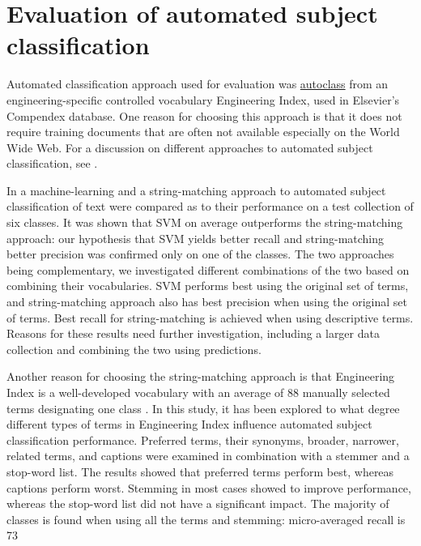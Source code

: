 \section{Evaluation of automated subject classification}
\label{autoclasseval}

Automated classification approach used for evaluation was \hyperref{string-matching of terms}{string-matching of terms (section }{)}{autoclass} from an engineering-specific controlled vocabulary Engineering Index, used in Elsevier's Compendex database. One reason for choosing this approach is that it does not require training documents that are often not available especially on the World Wide Web. For a discussion on different approaches to automated subject classification, see \cite{Golub_Review}. 

In \cite{ardo06:_ECDL} a machine-learning and a string-matching approach to automated subject classification of text were compared as to their performance on a test collection of six classes. It was shown that SVM on average outperforms the string-matching approach: our hypothesis that SVM yields better recall and string-matching better precision was confirmed only on one of the classes. The two approaches being complementary, we investigated different combinations of the two based on combining their vocabularies. SVM performs best using the original set of terms, and string-matching approach also has best precision when using the original set of terms. Best recall for string-matching is achieved when using descriptive terms. Reasons for these results need further investigation, including a larger data collection and combining the two using predictions. 

Another reason for choosing the string-matching approach is that Engineering Index is a well-developed vocabulary with an average of 88 manually selected terms designating one class \cite{GolubRole}. In this study, it has been explored to what degree different types of terms in Engineering Index influence automated subject classification performance. Preferred terms, their synonyms, broader, narrower, related terms, and captions were examined in combination with a stemmer and a stop-word list. The results showed that preferred terms perform best, whereas captions perform worst. Stemming in most cases showed to improve performance, whereas the stop-word list did not have a significant impact. The majority of classes is found when using all the terms and stemming: micro-averaged recall is 73%

